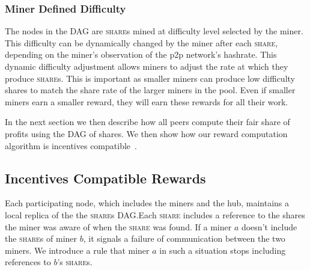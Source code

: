 \documentclass{article}
\begin{document}
\subsubsection{Miner Defined Difficulty}\label{sec:share-difficulty}

The nodes in the DAG are \textsc{share}s mined at difficulty level
selected by the miner. This difficulty can be dynamically changed by
the miner after each \textsc{share}, depending on the miner's
observation of the p2p network's hashrate. This dynamic difficulty
adjustment allows miners to adjust the rate at which they produce
\textsc{share}s. This is important as smaller miners can produce low
difficulty shares to match the share rate of the larger miners in the
pool. Even if smaller miners earn a smaller reward, they will earn
these rewards for all their work.

In the next section we then describe how all peers compute their fair
share of profits using the DAG of shares. We then show how our reward
computation algorithm is incentives
compatible~\cite{incentives-compatible}.

  
  
\subsection{Incentives Compatible Rewards}\label{sec:rewards}

Each participating node, which includes the miners and the hub,
maintains a local replica of the the \textsc{share}s DAG.\@ Each
\textsc{share} includes a reference to the shares the miner was aware
of when the \textsc{share} was found. If a miner $a$ doesn't include
the \textsc{share}s of miner $b$, it signals a failure of
communication between the two miners. We introduce a rule that miner
$a$ in such a situation stops including references to $b$'s
\textsc{share}s.
\end{document}
